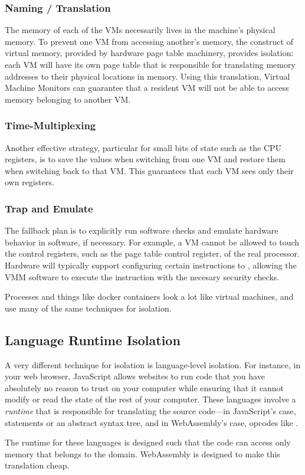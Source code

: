 \subsubsection{Naming / Translation}
The memory of each of the VMs necessarily lives in the machine's physical memory. To prevent one VM from accessing another's memory, the construct of virtual memory, provided by hardware page table machinery, provides isolation: each VM will have its own page table that is responsible for translating memory addresses to their physical locations in memory. Using this translation, Virtual Machine Monitors can guarantee that a resident VM will not be able to access memory belonging to another VM.

\subsubsection{Time-Multiplexing}
Another effective strategy, particular for small bits of state such as the CPU registers, is to save the values when switching from one VM and restore them when switching back to that VM. This guarantees that each VM sees only their own registers.

\subsubsection{Trap and Emulate}
The fallback plan is to explicitly run software checks and emulate hardware behavior in software, if necessary. For example, a VM cannot be allowed to touch the control registers, such as the page table control register, of the real processor. Hardware will typically support configuring certain instructions to , allowing the VMM software to execute the instruction with the necesary security checks.

Processes and things like docker containers look a lot like virtual machines, and use many of the same techniques for isolation.

\subsection{Language Runtime Isolation}
A very different technique for isolation is language-level isolation. For instance, in your web browser, JavaScript allows websites to run code that you have absolutely no reason to trust on your computer while ensuring that it cannot modify or read the state of the rest of your computer. These languages involve a \emph{runtime} that is responsible for translating the source code---in JavaScript's case, statements or an abstract syntax tree, and in WebAssembly's case, opcodes like .

The runtime for these languages is designed such that the code can access only memory that belongs to the domain. WebAssembly is designed to make this translation cheap.
